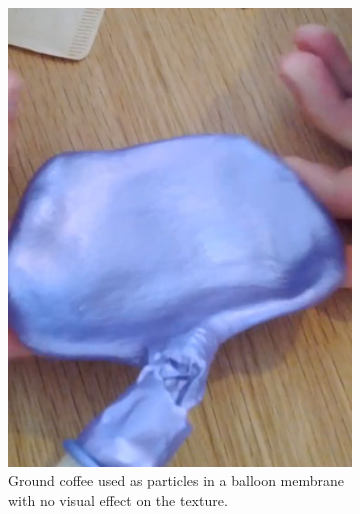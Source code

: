 \begin{figure}[h]
\centering
\begin{subfigure}[b]{.44\textwidth}
  \centering
  \includegraphics[width=\linewidth]{figures/jamming/balloon-coffee}
  \caption{Ground coffee used as particles in a balloon membrane with no visual effect on the texture.}
\end{subfigure}%
\hspace{0.02\textwidth}
\begin{subfigure}[b]{.44\textwidth}
  \centering

\end{subfigure}
\end{figure}
